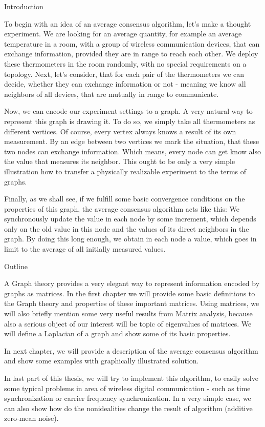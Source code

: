
\def\ctustyle{{\tenss CTUstyle}}
\def\ttb{\tt\char'\\} %

\chap Introduction

To begin with an idea of an average consensus algorithm, let's make a thought experiment. We are looking for an average quantity, for example an average temperature in a room, with a group of wireless communication devices, that can exchange information, provided they are in range to reach each other. We deploy these thermometers in the room randomly, with no special requirements on a topology. Next, let's consider, that for each pair of the thermometers we can decide, whether they can exchange information or not - meaning we know all neighbors of all devices, that are mutually in range to communicate.

Now, we can encode our experiment settings to a graph. A very natural way to represent this graph is drawing it. To do so, we simply take all thermometers as different vertices. Of course, every vertex always knows a result of its own measurement. By an edge between two vertices we mark the situation, that these two nodes can exchange information. Which means, every node can get know also the value that measures its neighbor. This ought to be only a very simple illustration how to transfer a physically realizable experiment to the terms of graphs.

Finally, as we shall see, if we fulfill some basic convergence conditions on the properties of this graph, the average consensus algorithm acts like this: We synchronously update the value in each node by some increment, which depends only on the old value in this node and the values of its direct neighbors in the graph. By doing this long enough, we obtain in each node a value, which goes in limit to the average of all initially measured values.

\sec Outline


A Graph theory provides a very elegant way to represent information encoded by graphs as matrices. In the first chapter we will provide some basic definitions to the Graph theory and properties of these important matrices. Using matrices, we will also briefly mention some very useful results from Matrix analysis, because also a serious object of our interest will be topic of eigenvalues of matrices. We will define a Laplacian of a graph and show some of its basic properties.

In next chapter, we will provide a description of the average consensus algorithm and show some examples with graphically illustrated solution.

In last part of this thesis, we will try to implement this algorithm, to easily solve some typical problems in area of wireless digital communication - such as time synchronization or carrier frequency synchronization. In a very simple case, we can also show how do the nonidealities change the result of algorithm (additive zero-mean noise).

